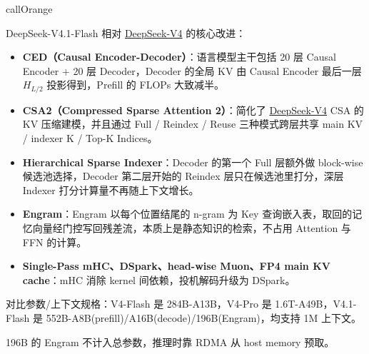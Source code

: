 \documentclass[zihao=false,fontset=windows]{ctexart}
\begin{document}
\begin{feishubox}{callOrange}{🤔}

DeepSeek-V4.1-Flash 相对 \href{https://my.feishu.cn/wiki/Gg57wvxiriwum6kVSlkctRy0nRh}{DeepSeek-V4} 的核心改进：\par
\begin{itemize}
\item 
\textcolor{feishuRed}{\textbf{CED（Causal Encoder-Decoder）}}：语言模型主干包括 20 层 Causal Encoder + 20 层 Decoder，Decoder 的全局 KV 由 Causal Encoder 最后一层 $H_{L/2}$ 投影得到，Prefill 的 FLOPs 大致减半。\par
\item 
\textcolor{feishuRed}{\textbf{CSA2（Compressed Sparse Attention 2）}}：简化了 \href{https://my.feishu.cn/wiki/Gg57wvxiriwum6kVSlkctRy0nRh}{DeepSeek-V4} CSA 的 KV 压缩建模，并且通过 Full / Reindex / Reuse 三种模式跨层共享 main KV / indexer K / Top-K Indices。\par
\item 
\textcolor{feishuRed}{\textbf{Hierarchical Sparse Indexer}}：Decoder 的第一个 Full 层额外做 block-wise 候选池选择，Decoder 第二层开始的 Reindex 层只在候选池里打分，深层 Indexer 打分计算量不再随上下文增长。\par
\item 
\textcolor{feishuRed}{\textbf{Engram}}：Engram 以每个位置结尾的 n-gram 为 Key 查询嵌入表，取回的记忆向量经门控写回残差流，本质上是静态知识的检索，不占用 Attention 与 FFN 的计算。\par
\item 
\textcolor{feishuRed}{\textbf{Single-Pass mHC、DSpark、head-wise Muon、FP4 main KV cache}}：mHC 消除 kernel 间依赖，投机解码升级为 DSpark。\par
\end{itemize}

对比参数/上下文规格：V4-Flash 是 284B-A13B，V4-Pro 是 1.6T-A49B，V4.1-Flash 是 552B-A8B(prefill)/A16B(decode)/196B(Engram)，均支持 1M 上下文。\par

\begin{feishuquote}

196B 的 Engram 不计入总参数，推理时靠 RDMA 从 host memory 预取。\par
\end{feishuquote}
\end{feishubox}
\end{document}
